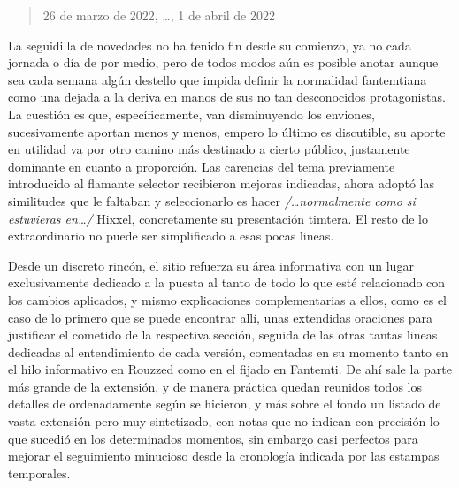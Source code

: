 \documentclass[
]{book}
\begin{document}
\begin{quote}
26 de marzo de 2022, \ldots, 1 de abril de 2022
\end{quote}

La seguidilla de novedades no ha tenido fin desde su comienzo, ya no cada jornada o día de por medio, pero de todos modos aún es posible anotar aunque sea cada semana algún destello que impida definir la normalidad fantemtiana como una dejada a la deriva en manos de sus no tan desconocidos protagonistas. La cuestión es que, específicamente, van disminuyendo los enviones, sucesivamente aportan menos y menos, empero lo último es discutible, su aporte en utilidad va por otro camino más destinado a cierto público, justamente dominante en cuanto a proporción. Las carencias del tema previamente introducido al flamante selector recibieron mejoras indicadas, ahora adoptó las similitudes que le faltaban y seleccionarlo es hacer \emph{/\ldots normalmente como si estuvieras en\ldots/} Hixxel, concretamente su presentación timtera. El resto de lo extraordinario no puede ser simplificado a esas pocas lineas.

Desde un discreto rincón, el sitio refuerza su área informativa con un lugar exclusivamente dedicado a la puesta al tanto de todo lo que esté relacionado con los cambios aplicados, y mismo explicaciones complementarias a ellos, como es el caso de lo primero que se puede encontrar allí, unas extendidas oraciones para justificar el cometido de la respectiva sección, seguida de las otras tantas lineas dedicadas al entendimiento de cada versión, comentadas en su momento tanto en el hilo informativo en Rouzzed como en el fijado en Fantemti. De ahí sale la parte más grande de la extensión, y de manera práctica quedan reunidos todos los detalles de ordenadamente según se hicieron, y más sobre el fondo un listado de vasta extensión pero muy sintetizado, con notas que no indican con precisión lo que sucedió en los determinados momentos, sin embargo casi perfectos para mejorar el seguimiento minucioso desde la cronología indicada por las estampas temporales.
\end{document}
